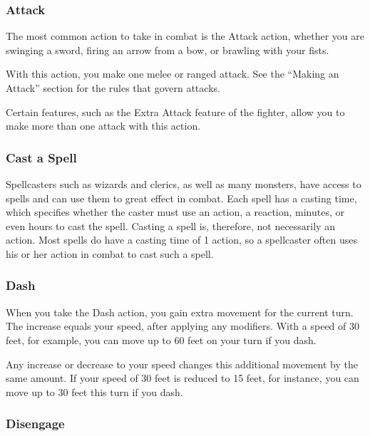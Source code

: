 \documentclass[
]{article}
\begin{document}
\hypertarget{attack}{%
\subsubsection{Attack}\label{attack}}

The most common action to take in combat is the Attack action, whether
you are swinging a sword, firing an arrow from a bow, or brawling with
your fists.

With this action, you make one melee or ranged attack. See the ``Making
an Attack'' section for the rules that govern attacks.

Certain features, such as the Extra Attack feature of the fighter, allow
you to make more than one attack with this action.

\hypertarget{cast-a-spell}{%
\subsubsection{Cast a Spell}\label{cast-a-spell}}

Spellcasters such as wizards and clerics, as well as many monsters, have
access to spells and can use them to great effect in combat. Each spell
has a casting time, which specifies whether the caster must use an
action, a reaction, minutes, or even hours to cast the spell. Casting a
spell is, therefore, not necessarily an action. Most spells do have a
casting time of 1 action, so a spellcaster often uses his or her action
in combat to cast such a spell.

\hypertarget{dash}{%
\subsubsection{Dash}\label{dash}}

When you take the Dash action, you gain extra movement for the current
turn. The increase equals your speed, after applying any modifiers. With
a speed of 30 feet, for example, you can move up to 60 feet on your turn
if you dash.

Any increase or decrease to your speed changes this additional movement
by the same amount. If your speed of 30 feet is reduced to 15 feet, for
instance, you can move up to 30 feet this turn if you dash.

\hypertarget{disengage}{%
\subsubsection{Disengage}\label{disengage}}
\end{document}
